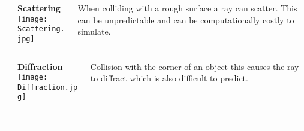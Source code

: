 \documentclass[final]{beamer}
\theoremstyle{plain}
\theoremstyle{definition}
\theoremstyle{remark}
\newlength{\threecolwid}
\begin{document}
\begin{frame}[t]
\begin{columns}[t]
\begin{column}{\threecolwid}
\begin{mdframed}[backgroundcolor=jblue!15, linecolor=jblue!70,
  linewidth=20pt,
  topline=true,
  rightline=true,
  leftline=true, bottomline=true, userdefinedwidth=0.999999999999999\linewidth]
  \begin{columns}
  \begin{column}{0.01\linewidth}
  \end{column}
  \begin{column}{0.445\linewidth}
\textbf{Scattering} \\
\texttt{[image: Scattering.jpg]} 
\\   
\end{column}

\begin{column}{0.53\linewidth}
When colliding with a rough surface a ray can scatter. This can be unpredictable and can be computationally costly to simulate. \cite{Antennas2007}
 \end{column}
 \end{columns}
 \vspace{1cm}
 \begin{columns}
 \begin{column}{0.01\linewidth}
  \end{column}
\begin{column}{0.445\linewidth}
\textbf{Diffraction} \\
\texttt{[image: Diffraction.jpg]}
\end{column}
\begin{column}{0.53\linewidth}
Collision with the corner of an object this causes the ray to diffract which is also difficult to predict.
\end{column}
\end{columns}
\end{mdframed}




-------------------------------------








\end{column}
\end{columns}
\end{frame}
\end{document}
